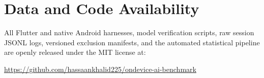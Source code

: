 \section*{Data and Code Availability}
All Flutter and native Android harnesses, model verification scripts, raw session JSONL logs, versioned exclusion manifests, and the automated statistical pipeline are openly released under the MIT license at:
\begin{center}
\small\url{https://github.com/hassaankhalid225/ondevice-ai-benchmark}
\end{center}
